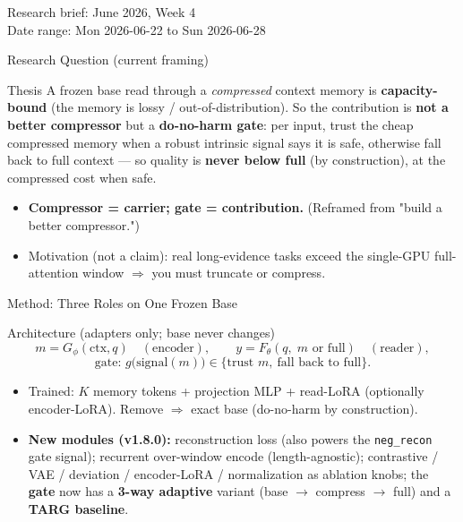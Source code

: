 
\begin{frame}
  \titlepage
  \vspace{-1.0em}
  \begin{center}
    \small Research brief: June 2026, Week 4 \\
    \scriptsize Date range: Mon 2026-06-22 to Sun 2026-06-28
  \end{center}
\end{frame}

\begin{frame}{Research Question (current framing)}
  \begin{block}{Thesis}
    A frozen base read through a \emph{compressed} context memory is \textbf{capacity-bound} (the memory is lossy /
    out-of-distribution). So the contribution is \textbf{not a better compressor} but a \textbf{do-no-harm gate}:
    per input, trust the cheap compressed memory when a robust intrinsic signal says it is safe, otherwise fall back
    to full context --- so quality is \textbf{never below full} (by construction), at the compressed cost when safe.
  \end{block}
  \begin{itemize}
    \item \textbf{Compressor = carrier; gate = contribution.} (Reframed from "build a better compressor.")
    \item Motivation (not a claim): real long-evidence tasks exceed the single-GPU full-attention window $\Rightarrow$ you must truncate or compress.
  \end{itemize}
\end{frame}

\begin{frame}{Method: Three Roles on One Frozen Base}
  \begin{block}{Architecture (adapters only; base never changes)}
    \[
      m = G_\phi(\text{ctx}, q)\quad(\text{encoder}),\qquad
      y = F_\theta(q,\; m \text{ or full})\quad(\text{reader}),
    \]
    \[
      \text{gate: } g\big(\text{signal}(m)\big) \in \{\text{trust } m,\ \text{fall back to full}\}.
    \]
  \end{block}
  \begin{itemize}
    \item Trained: $K$ memory tokens + projection MLP + read-LoRA (optionally encoder-LoRA). Remove $\Rightarrow$ exact base (do-no-harm by construction).
    \item \textbf{New modules (v1.8.0):} reconstruction loss (also powers the \texttt{neg\_recon} gate signal); recurrent over-window encode (length-agnostic); contrastive / VAE / deviation / encoder-LoRA / normalization as ablation knobs; the \textbf{gate} now has a \textbf{3-way adaptive} variant (base $\to$ compress $\to$ full) and a \textbf{TARG baseline}.
  \end{itemize}
\end{frame}

